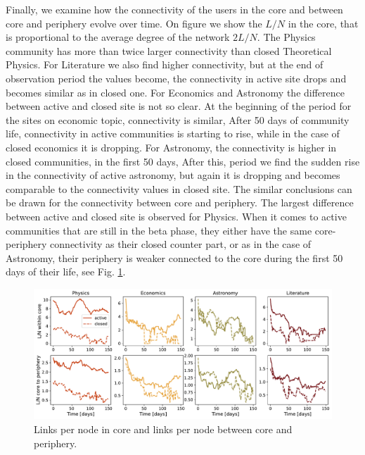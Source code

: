 Finally, we examine how the connectivity of the users in the core and between core and periphery evolve over time. On figure we show the $L/N$ in the core, that is proportional to the average degree of the network $2L/N$. The Physics community has more than twice larger connectivity than closed Theoretical Physics. For Literature we also find higher connectivity, but at the end of observation period the values become, the connectivity in active site drops and becomes similar as in closed one. For Economics and Astronomy the difference between active and closed site is not so clear. At the beginning of the period for the sites on economic topic, connectivity is similar, After 50 days of community life, connectivity in active communities is starting to rise, while in the case of closed economics it is dropping. For Astronomy, the connectivity is higher in closed communities, in the first 50 days, After this, period we find the sudden rise in the connectivity of active astronomy, but again it is dropping and becomes comparable to the connectivity values in closed site. The similar conclusions can be drawn for the connectivity between core and periphery. The largest difference between active and closed site is observed for Physics.  When it comes to active communities that are still in the beta phase, they either have the same core-periphery connectivity as their closed counter part, or as in the case of Astronomy, their periphery is weaker connected to the core during the first 50 days of their life, see Fig. \ref{fig:links_per_node}. 

\begin{figure}[h]
	\centering
	\includegraphics[width=\linewidth]{figures/stackexchange/core_connectivity.pdf}
	\caption{Links per node in core and links per node between core and periphery.}
	\label{fig:links_per_node}
\end{figure}

